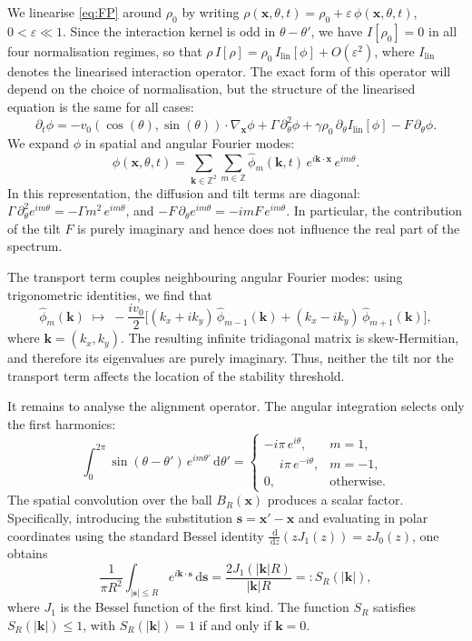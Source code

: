 \documentclass[a4paper,11pt]{article}
\theoremstyle{plain}
\theoremstyle{definition}
\theoremstyle{remark}
\newcommand{\Z}{\mathbb{Z}}
\newcommand{\dd}{\,\mathrm{d}}
\newcommand{\bx}{\mathbf{x}}
\newcommand{\bk}{\mathbf{k}}
\newcommand{\bs}{\mathbf{s}}
\begin{document}
We linearise \eqref{eq:FP} around $\rho_0$ by writing $\rho(\bx,\theta,t) = \rho_0 + \varepsilon\,\phi(\bx,\theta,t)$, $0 < \varepsilon \ll 1$. Since the interaction kernel is odd in $\theta - \theta'$, we have $I[\rho_0] = 0$ in all four normalisation regimes, so that $\rho\, I[\rho] = \rho_0\, I_{\mathrm{lin}}[\phi] + O(\varepsilon^2)$, where $I_{\mathrm{lin}}$ denotes the linearised interaction operator. The exact form of this operator will depend on the choice of normalisation, but the structure of the linearised equation is the same for all cases:
\begin{equation}\label{eq:linearised-h0}
    \partial_t \phi = -v_0(\cos(\theta),\sin(\theta))\cdot\nabla_\bx \phi
    + \Gamma\,\partial_\theta^2 \phi
    + \gamma\rho_0\,\partial_\theta I_{\mathrm{lin}}[\phi]
    - F\,\partial_\theta\phi.
\end{equation}
We expand $\phi$ in spatial and angular Fourier modes:
\[
    \phi(\bx,\theta,t) = \sum_{\bk \in \Z^2}\sum_{m \in \Z}
    \hat\phi_m(\bk,t)\, e^{i\bk\cdot\bx}\, e^{im\theta}.
\]
In this representation, the diffusion and tilt terms are diagonal:  $\Gamma\,\partial_\theta^2 e^{im\theta} = -\Gamma m^2\, e^{im\theta}$, and 
$-F\,\partial_\theta e^{im\theta} = -imF\, e^{im\theta}$. In particular, the contribution of the tilt $F$ is purely imaginary and hence does not influence the real part of the spectrum.

The transport term couples neighbouring angular Fourier modes: using trigonometric identities, we find that
\[
    \hat\phi_m(\bk) \;\longmapsto\;
    -\frac{iv_0}{2}\Big[(k_x + ik_y)\,\hat\phi_{m-1}(\bk)
    + (k_x - ik_y)\,\hat\phi_{m+1}(\bk)\Big],
\]
where $\bk = (k_x, k_y)$. The resulting infinite tridiagonal matrix is skew-Hermitian, and therefore its eigenvalues are purely imaginary. Thus, neither the tilt nor the transport term affects the location of the stability threshold.

It remains to analyse the alignment operator.
The angular integration selects only the first harmonics:
\begin{equation*}\label{eq:angular-selection}
    \int_0^{2\pi} \sin(\theta - \theta')\, e^{im\theta'}\dd\theta'
    = \begin{cases}
        -i\pi\, e^{i\theta}, & m = 1, \\
        \phantom{-}i\pi\, e^{-i\theta}, & m = -1, \\
        0, & \text{otherwise}.
    \end{cases}
\end{equation*}
The spatial convolution over the ball $B_R(\bx)$ produces a scalar factor. Specifically, introducing the substitution $\bs = \bx' - \bx$ and evaluating in polar coordinates using the standard Bessel identity $\frac{\dd}{\dd z}(zJ_1(z)) = zJ_0(z)$, one obtains
\begin{equation*}\label{eq:bessel-factor}
    \frac{1}{\pi R^2}\int_{|\bs| \leq R} e^{i\bk\cdot\bs}\dd\bs
    = \frac{2J_1(|\bk|R)}{|\bk|R} =: S_R(|\bk|),
\end{equation*}
where $J_1$ is the Bessel function of the first kind. The function $S_R$ satisfies $ S_R(|\bk|) \leq 1$, with $S_R(|\bk|) = 1$ if and only if $\bk = 0$.
\end{document}
